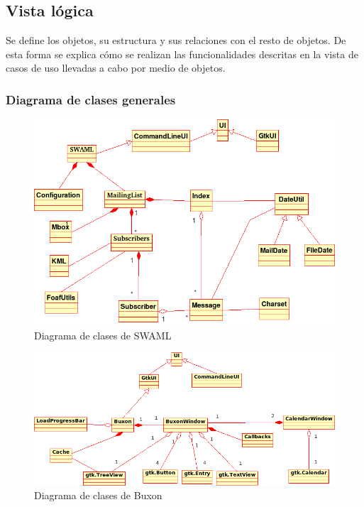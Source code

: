 
\subsection{Vista lógica}

Se define los objetos, su estructura y sus relaciones con el resto de objetos.
De esta forma se explica cómo se realizan las funcionalidades descritas en la 
vista de casos de uso llevadas a cabo por medio de objetos. 

\subsubsection{Diagrama de clases generales}

\begin{figure}[H]
	\centering
 	\includegraphics[width=15cm]{images/uml/clases/swaml.png}
	\caption{Diagrama de clases de SWAML}
	\label{fig:uml:swaml}
\end{figure}

\begin{figure}[H]
	\centering
 	\includegraphics[width=17cm]{images/uml/clases/buxon.png}
	\caption{Diagrama de clases de Buxon}
	\label{fig:uml:buxon}
\end{figure}

